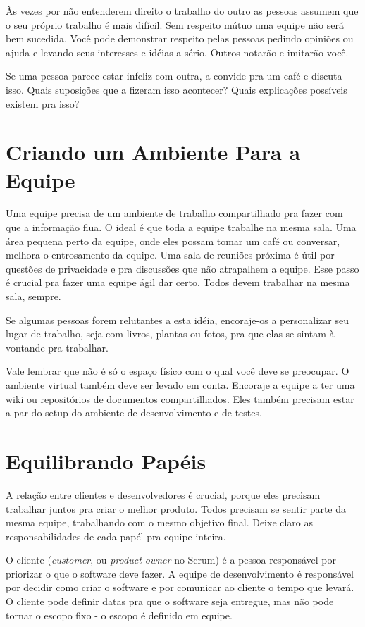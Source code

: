 \documentclass[a4paper, 10pt, font=plain]{abnt}
\begin{document}
Às vezes por não entenderem direito o trabalho do outro as pessoas assumem que o seu próprio trabalho é mais difícil. Sem respeito mútuo uma equipe não será bem sucedida. Você pode demonstrar respeito pelas pessoas pedindo opiniões ou ajuda e levando seus interesses e idéias a sério. Outros notarão e imitarão você.

Se uma pessoa parece estar infeliz com outra, a convide pra um café e discuta isso. Quais suposições que a fizeram isso acontecer? Quais explicações possíveis existem pra isso?


\section{Criando um Ambiente Para a Equipe}
Uma equipe precisa de um ambiente de trabalho compartilhado pra fazer com que a informação flua. O ideal é que toda a equipe trabalhe na mesma sala. Uma área pequena perto da equipe, onde eles possam tomar um café ou conversar, melhora o entrosamento da equipe. Uma sala de reuniões próxima é útil por questões de privacidade e pra discussões que não atrapalhem a equipe. Esse passo é crucial pra fazer uma equipe ágil dar certo. Todos devem trabalhar na mesma sala, sempre.

Se algumas pessoas forem relutantes a esta idéia, encoraje-os a personalizar seu lugar de trabalho, seja com livros, plantas ou fotos, pra que elas se sintam à vontande pra trabalhar.

Vale lembrar que não é só o espaço físico com o qual você deve se preocupar. O ambiente virtual também deve ser levado em conta. Encoraje a equipe a ter uma wiki ou repositórios de documentos compartilhados. Eles também precisam estar a par do setup do ambiente de desenvolvimento e de testes.


\section{Equilibrando Papéis}
A relação entre clientes e desenvolvedores é crucial, porque eles precisam trabalhar juntos pra criar o melhor produto. Todos precisam se sentir parte da mesma equipe, trabalhando com o mesmo objetivo final. Deixe claro as responsabilidades de cada papél pra equipe inteira.

O cliente (\textit{customer}, ou \textit{product owner} no Scrum) é a pessoa responsável por priorizar o que o software deve fazer. A equipe de desenvolvimento é responsável por decidir como criar o software e por comunicar ao cliente o tempo que levará. O cliente pode definir datas pra que o software seja entregue, mas não pode tornar o escopo fixo - o escopo é definido em equipe.
\end{document}
